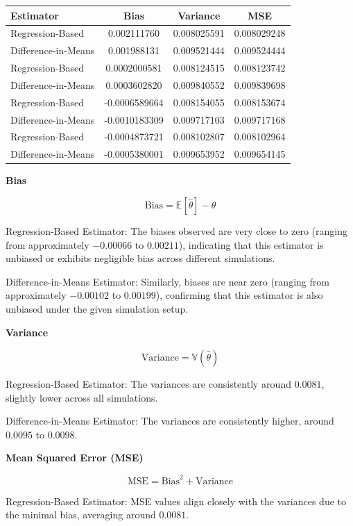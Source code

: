 \documentclass{article}
\begin{document}
\begin{center}
\begin{tabular}{lccc}
\hline
\textbf{Estimator} & \textbf{Bias} & \textbf{Variance} & \textbf{MSE} \\
\hline
Regression-Based & 0.002111760 & 0.008025591 & 0.008029248 \\
Difference-in-Means & 0.001988131 & 0.009521444 & 0.009524444 \\
\hline
Regression-Based & 0.0002000581 & 0.008124515 & 0.008123742 \\
Difference-in-Means & 0.0003602820 & 0.009840552 & 0.009839698 \\
\hline
Regression-Based & -0.0006589664 & 0.008154055 & 0.008153674 \\
Difference-in-Means & -0.0010183309 & 0.009717103 & 0.009717168 \\
\hline
Regression-Based & -0.0004873721 & 0.008102807 & 0.008102964 \\
Difference-in-Means & -0.0005380001 & 0.009653952 & 0.009654145 \\
\hline
\end{tabular}
\end{center}

\textbf{Bias}

\[
\text{Bias} = \mathbb{E}[\hat{\theta}] - \theta
\]

Regression-Based Estimator: The biases observed are very close to zero (ranging from approximately \(-0.00066\) to \(0.00211\)), indicating that this estimator is unbiased or exhibits negligible bias across different simulations.

Difference-in-Means Estimator: Similarly, biases are near zero (ranging from approximately \(-0.00102\) to \(0.00199\)), confirming that this estimator is also unbiased under the given simulation setup.

\textbf{Variance}

\[
\text{Variance} = \mathbb{V}(\hat{\theta})
\]

Regression-Based Estimator: The variances are consistently around \(0.0081\), slightly lower across all simulations.

Difference-in-Means Estimator: The variances are consistently higher, around \(0.0095\) to \(0.0098\).

\textbf{Mean Squared Error (MSE)}

\[
\text{MSE} = \text{Bias}^2 + \text{Variance}
\]

Regression-Based Estimator: MSE values align closely with the variances due to the minimal bias, averaging around \(0.0081\).
\end{document}
